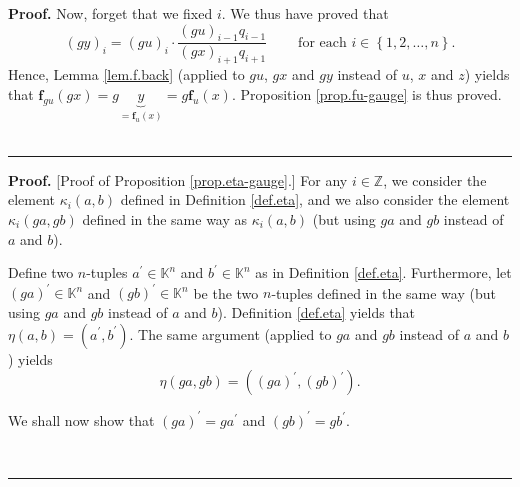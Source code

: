\documentclass[numbers=enddot,12pt,final,onecolumn,notitlepage]{scrartcl}%
\theoremstyle{definition}
\newenvironment{proof}[1][Proof]{\noindent\textbf{#1.} }{\ \rule{0.5em}{0.5em}}
\newenvironment{verlong}{}{}
\begin{document}
\begin{verlong}
\begin{proof}
Now, forget that we fixed $i$. We thus have proved that
\[
\left(  gy\right)  _{i}=\left(  gu\right)  _{i}\cdot\dfrac{\left(  gu\right)
_{i-1}q_{i-1}}{\left(  gx\right)  _{i+1}q_{i+1}}\ \ \ \ \ \ \ \ \ \ \text{for
each }i\in\left\{  1,2,\ldots,n\right\}  .
\]
Hence, Lemma \ref{lem.f.back} (applied to $gu$, $gx$ and $gy$ instead of $u$,
$x$ and $z$) yields that $\mathbf{f}_{gu}\left(  gx\right)  =g\underbrace{y}%
_{=\mathbf{f}_{u}\left(  x\right)  }=g\mathbf{f}_{u}\left(  x\right)  $.
Proposition \ref{prop.fu-gauge} is thus proved.
\end{proof}

\begin{proof}
[Proof of Proposition \ref{prop.eta-gauge}.] For any $i\in\mathbb{Z}$, we
consider the element $\kappa_{i}\left(  a,b\right)  $ defined in Definition
\ref{def.eta}, and we also consider the element $\kappa_{i}\left(
ga,gb\right)  $ defined in the same way as $\kappa_{i}\left(  a,b\right)  $
(but using $ga$ and $gb$ instead of $a$ and $b$).

Define two $n$-tuples $a^{\prime}\in\mathbb{K}^{n}$ and $b^{\prime}%
\in\mathbb{K}^{n}$ as in Definition \ref{def.eta}. Furthermore, let $\left(
ga\right)  ^{\prime}\in\mathbb{K}^{n}$ and $\left(  gb\right)  ^{\prime}%
\in\mathbb{K}^{n}$ be the two $n$-tuples defined in the same way (but using
$ga$ and $gb$ instead of $a$ and $b$). Definition \ref{def.eta} yields that
$\eta\left(  a,b\right)  =\left(  a^{\prime},b^{\prime}\right)  $. The same
argument (applied to $ga$ and $gb$ instead of $a$ and $b$) yields
\begin{equation}
\eta\left(  ga,gb\right)  =\left(  \left(  ga\right)  ^{\prime},\left(
gb\right)  ^{\prime}\right)  .\label{pf.prop.eta-gauge.etag1}%
\end{equation}


We shall now show that $\left(  ga\right)  ^{\prime}=ga^{\prime}$ and $\left(
gb\right)  ^{\prime}=gb^{\prime}$.


\end{proof}
\end{verlong}
\end{document}
